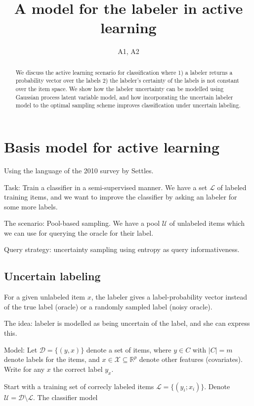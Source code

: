 \documentclass[10pt, onecolumn]{article}
\newcommand{\U}{\mathcal{U}}
\renewcommand{\L}{\mathcal{L}}
\newcommand{\R}{\mathbb{R}}
\newcommand{\X}{\mathcal{X}}
\newcommand{\D}{\mathcal{D}}
\begin{document}
\title{A model for the labeler in active learning}
\author{A1, A2}
\maketitle


\begin{abstract}
We discuss the active learning scenario for classification where 1) a labeler returns a probability vector over the labels 2) the labeler's certainty of the labels is not constant over the item space. We show how the labeler uncertainty can be modelled using Gaussian process latent variable model, and how incorporating the uncertain labeler model to the optimal sampling scheme improves classification under uncertain labeling.
\end{abstract}

\section{Basis model for active learning}
Using the language of the 2010 survey by Settles.

Task: Train a classifier in a semi-supervised manner. We have a set $\L$ of labeled training items, and we want to improve the classifier by asking an labeler for some more labels. 

The scenario: Pool-based sampling. We have a pool $\U$ of unlabeled items which we can use for querying the oracle for their label.

Query strategy: uncertainty sampling using entropy as query informativeness.

\subsection{Uncertain labeling}
For a given unlabeled item $x$, the labeler gives a label-probability vector instead of the true label (oracle) or a randomly sampled label (noisy oracle).

The idea: labeler is modelled as being uncertain of the label, and she can express this. 

Model: Let $\D=\{(y,x)\}$ denote a set of items, where $y\in C$ with $|C|=m$ denote labels for the items, and $x\in \X\subseteq \R^p$ denote other features (covariates). Write for any $x$ the correct label $y_x$. 

Start with a training set of correcly labeled items $\L=\{(y_i; x_i)\}$. Denote $\U=\D\setminus \L$. The classifier model
\end{document}
